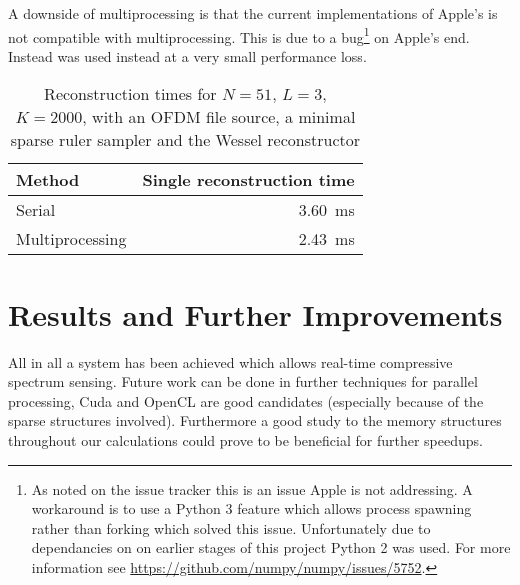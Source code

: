 \documentclass[a4paper, openany, oneside]{memoir}
\begin{document}
A downside of multiprocessing is that the current implementations of Apple's  is not compatible with multiprocessing. This is due to a bug\footnote{As noted on the  issue tracker this is an issue Apple is not addressing. A workaround is to use a Python 3 feature which allows process spawning rather than forking which solved this issue. Unfortunately due to dependancies on  on earlier stages of this project Python 2 was used. For more information see \url{https://github.com/numpy/numpy/issues/5752}.} on Apple's end. Instead  was used instead at a very small performance loss.

\begin{table}
    \centering
    \caption{Reconstruction times for $N = 51$, $L=3$, $K=2000$, with an OFDM file source, a minimal sparse ruler sampler and the Wessel reconstructor}
    \label{tab:mp}
    \begin{tabular}{lr}
        \toprule
        Method          & Single reconstruction time\\
        \midrule
        Serial          & \SI{3.60}{\milli\second}\\
        Multiprocessing & \SI{2.43}{\milli\second}\\
        \bottomrule
    \end{tabular}
\end{table}

\section{Results and Further Improvements}
\label{sec:results}
All in all a system has been achieved which allows real-time compressive spectrum sensing. Future work can be done in further techniques for parallel processing, Cuda and OpenCL are good candidates (especially because of the sparse structures involved). Furthermore a good study to the memory structures throughout our calculations could prove to be beneficial for further speedups.
\end{document}
